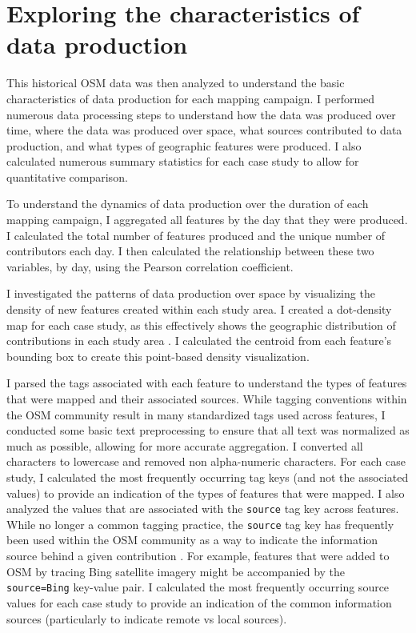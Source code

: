 \section{Exploring the characteristics of data production}
\label{sec-production}

This historical OSM data was then analyzed to understand the basic characteristics of data production for each mapping campaign. I performed numerous data processing steps to understand how the data was produced over time, where the data was produced over space, what sources contributed to data production, and what types of geographic features were produced. I also calculated numerous summary statistics for each case study to allow for quantitative comparison.

To understand the dynamics of data production over the duration of each mapping campaign, I aggregated all features by the day that they were produced. I calculated the total number of features produced and the unique number of contributors each day. I then calculated the relationship between these two variables, by day, using the Pearson correlation coefficient. 

I investigated the patterns of data production over space by visualizing the density of new features created within each study area. I created a dot-density map for each case study, as this effectively shows the geographic distribution of contributions in each study area \parencite{kimerling_dotting_2009}. I calculated the centroid from each feature's bounding box to create this point-based density visualization. 

I parsed the tags associated with each feature to understand the types of features that were mapped and their associated sources. While tagging conventions within the OSM community result in many standardized tags used across features, I conducted some basic text preprocessing to ensure that all text was normalized as much as possible, allowing for more accurate aggregation. I converted all characters to lowercase and removed non alpha-numeric characters. For each case study, I calculated the most frequently occurring tag keys (and not the associated values) to provide an indication of the types of features that were mapped. I also analyzed the values that are associated with the \texttt{source} tag key across features. While no longer a common tagging practice, the \texttt{source} tag key has frequently been used within the OSM community as a way to indicate the information source behind a given contribution \parencite{openstreetmap_wiki_keysource_2020}. For example, features that were added to OSM by tracing Bing satellite imagery might be accompanied by the \texttt{source=Bing} key-value pair. I calculated the most frequently occurring source values for each case study to provide an indication of the common information sources (particularly to indicate remote vs local sources). 

